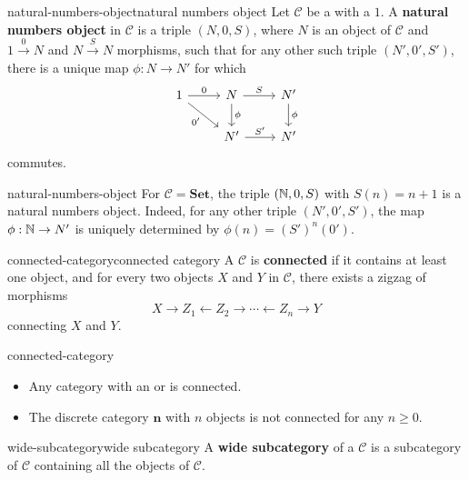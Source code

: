 \begin{topic}{natural-numbers-object}{natural numbers object}
    Let $\mathcal{C}$ be a  with a  $1$. A \textbf{natural numbers object} in $\mathcal{C}$ is a triple $(N, 0, S)$, where $N$ is an object of $\mathcal{C}$ and $1 \xrightarrow{0} N$ and $N \xrightarrow{S} N$ morphisms, such that for any other such triple $(N', 0', S')$, there is a unique map $\phi : N \to N'$ for which
    \[ \begin{tikzcd} 1 \arrow{r}{0} \arrow[swap]{rd}{0'} & N \arrow{d}{\phi} \arrow{r}{S} & N' \arrow{d}{\phi} \\ & N' \arrow{r}{S'} & N' \end{tikzcd} \]
    commutes.
\end{topic}

\begin{example}{natural-numbers-object}
    For $\mathcal{C} = \textbf{Set}$, the triple $(\mathbb{N}, 0, S)$ with $S(n) = n + 1$ is a natural numbers object. Indeed, for any other triple $(N', 0', S')$, the map $\phi : \mathbb{N} \to N'$ is uniquely determined by $\phi(n) = (S')^n(0')$.
\end{example}

\begin{topic}{connected-category}{connected category}
    A  $\mathcal{C}$ is \textbf{connected} if it contains at least one object, and for every two objects $X$ and $Y$ in $\mathcal{C}$, there exists a zigzag of morphisms
    \[ X \rightarrow Z_1 \leftarrow Z_2 \rightarrow \cdots \leftarrow Z_n \rightarrow Y \]
    connecting $X$ and $Y$.
\end{topic}

\begin{example}{connected-category}
    \begin{itemize}
        \item Any category with an  or  is connected.
        \item The discrete category $\textbf{n}$ with $n$ objects is not connected for any $n \ge 0$.
    \end{itemize}
\end{example}

\begin{topic}{wide-subcategory}{wide subcategory}
    A \textbf{wide subcategory} of a  $\mathcal{C}$ is a subcategory of $\mathcal{C}$ containing all the objects of $\mathcal{C}$.
\end{topic}
